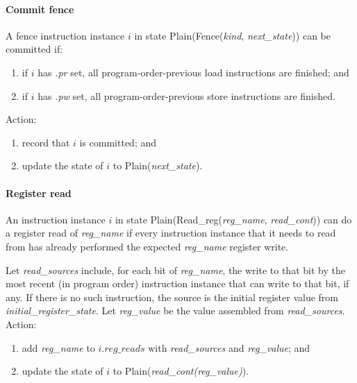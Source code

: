 \paragraph{Commit fence}\label{omm:commit_fence}
A fence instruction instance $i$ in state {\sc Plain}({\sc Fence}({\it kind}, {\it next\_state})) can be committed if:
\begin{enumerate}
\item if $i$ has {\em .pr} set, all program-order-previous load instructions are finished; and
\item if $i$ has {\em .pw} set, all program-order-previous store instructions are finished.
\end{enumerate}
Action:
\begin{enumerate}
\item record that $i$ is committed; and
\item update the state of $i$ to {\sc Plain}({\it next\_state}).
\end{enumerate}


\paragraph{Register read}\label{omm:reg_read}
An instruction instance $i$ in state {\sc Plain}({\sc Read\_reg}({\it reg\_name}, {\it read\_cont})) can do a register read of {\it reg\_name} if every instruction instance that it needs to read from has already performed the expected {\it reg\_name} register write.

Let {\it read\_sources} include, for each bit of {\it reg\_name}, the write to
that bit by the most recent (in program order) instruction instance that can write to that bit, if any. If there is no such instruction, the source is the initial register value from {\it initial\_register\_state}.
Let  {\it reg\_value} be the value assembled from {\it read\_sources}.
Action:
\begin{enumerate}
\item add {\it reg\_name} to $i.\textit{reg\_reads}$ with {\it read\_sources} and {\it reg\_value}; and
\item update the state of $i$ to {\sc Plain}({\it read\_cont(reg\_value)}).
\end{enumerate}


